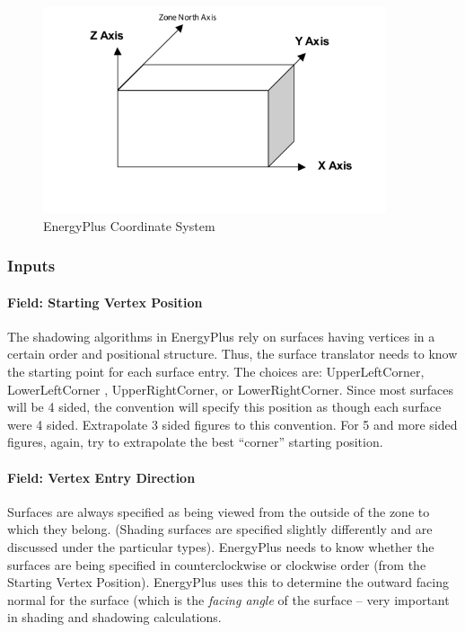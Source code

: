 \begin{figure}[hbtp] %
\centering
\includegraphics[width=0.9\textwidth, height=0.9\textheight, keepaspectratio=true]{media/image054.png}
\caption{EnergyPlus Coordinate System \protect \label{fig:energyplus-coordinate-system}}
\end{figure}

\subsubsection{Inputs}\label{inputs-3-038}

\paragraph{Field: Starting Vertex Position}\label{field-starting-vertex-position}

The shadowing algorithms in EnergyPlus rely on surfaces having vertices in a certain order and positional structure. Thus, the surface translator needs to know the starting point for each surface entry. The choices are: UpperLeftCorner, LowerLeftCorner , UpperRightCorner, or LowerRightCorner. Since most surfaces will be 4 sided, the convention will specify this position as though each surface were 4 sided. Extrapolate 3 sided figures to this convention. For 5 and more sided figures, again, try to extrapolate the best ``corner'' starting position.

\paragraph{Field: Vertex Entry Direction}\label{field-vertex-entry-direction}

Surfaces are always specified as being viewed from the outside of the zone to which they belong. (Shading surfaces are specified slightly differently and are discussed under the particular types). EnergyPlus needs to know whether the surfaces are being specified in counterclockwise or clockwise order (from the Starting Vertex Position). EnergyPlus uses this to determine the outward facing normal for the surface (which is the \emph{facing angle} of the surface -- very important in shading and shadowing calculations.

